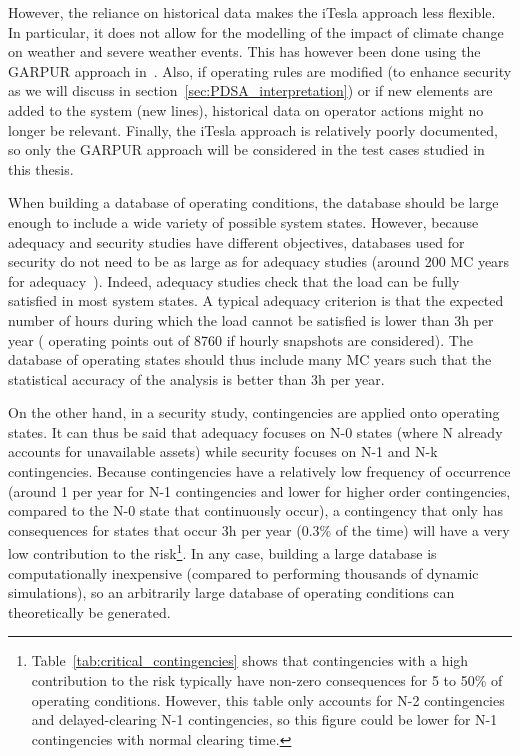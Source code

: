 However, the reliance on historical data makes the iTesla approach less flexible. In particular, it does not allow for the modelling of the impact of climate change on weather and severe weather events. This has however been done using the GARPUR approach in~\cite{ENTSOE_MC_year}. Also, if operating rules are modified (\eg to enhance security as we will discuss in section~\ref{sec:PDSA_interpretation}) or if new elements are added to the system (\eg new lines), historical data on operator actions might no longer be relevant. Finally, the iTesla approach is relatively poorly documented, so only the GARPUR approach will be considered in the test cases studied in this thesis.

When building a database of operating conditions, the database should be large enough to include a wide variety of possible system states. However, because adequacy and security studies have different objectives, databases used for security do not need to be as large as for adequacy studies (around 200 MC years for adequacy~\cite{EliaAdequacy}). Indeed, adequacy studies check that the load can be fully satisfied in most system states. A typical adequacy criterion is that the expected number of hours during which the load cannot be satisfied is lower than 3h per year ( operating points out of 8760 if hourly snapshots are considered). The database of operating states should thus include many MC years such that the statistical accuracy of the analysis is better than 3h per year.

On the other hand, in a security study, contingencies are applied onto operating states. It can thus be said that adequacy focuses on N-0 states (where N already accounts for unavailable assets) while security focuses on N-1 and N-k contingencies. Because contingencies have a relatively low frequency of occurrence (around 1 per year for N-1 contingencies and lower for higher order contingencies, compared to the N-0 state that continuously occur), a contingency that only has consequences for states that occur 3h per year (0.3\% of the time) will have a very low contribution to the risk\footnote{Table~\ref{tab:critical_contingencies} shows that contingencies with a high contribution to the risk typically have non-zero consequences for 5 to 50\% of operating conditions. However, this table only accounts for N-2 contingencies and delayed-clearing N-1 contingencies, so this figure could be lower for N-1 contingencies with normal clearing time.}. In any case, building a large database is computationally inexpensive (compared to performing thousands of dynamic simulations), so an arbitrarily large database of operating conditions can theoretically be generated.


